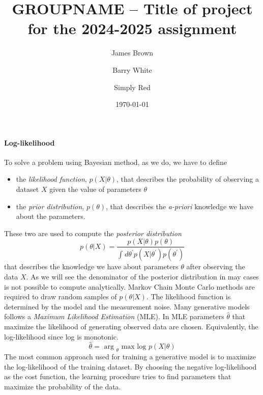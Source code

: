 \documentclass[prl,twocolumn]{revtex4-1}
\begin{document}
\title{GROUPNAME -- Title of project for the 2024-2025 assignment}





\author{James Brown}
\author{Barry White}
\author{Simply Red}

\date{\today}



\maketitle

\paragraph{\bf Log-likelihood} To solve a problem using Bayesian method, as we do, we have to define
\begin{itemize}
	\item the \emph{likelihood function}, $p\left( X|\theta   \right)$, that describes the probability of observing a dataset $X$ given the value of parameters $\theta $
	\item the \emph{prior distribution}, $p\left( \theta  \right)$, that describes the \emph{a-priori} knowledge we have about the parameters.
\end{itemize}
These two are used to compute the \emph{posterior distribution}
\begin{equation}
p\left( \theta |X  \right) = \frac{p\left( X|\theta  \right)p\left( \theta  \right)}{\int_{}^{}{d\theta^{\prime } p\left( X|\theta ^{\prime } \right)p\left( \theta ^{\prime } \right)}}
\end{equation}
that describes the knowledge we have  about parameters $\theta $ after observing the data $X$. As we will see the denominator of the posterior distribution in may cases is not possible to compute analytically. Markov Chain Monte Carlo methods are required to draw random samples of $p\left( \theta |X \right)$.
The likelihood function is determined by the model and the measurement noise. Many generative models follows a \emph{Maximum Likelihood Estimation} (MLE). In MLE parameters $\hat{\theta }$ that maximize the likelihood of generating observed data are chosen. Equivalently, the log-likelihood since log is monotonic.
\begin{equation}
\hat{\theta } = \text{ arg }_{\theta } \text{ max log }p\left( X|\theta  \right)
\end{equation}
The most common approach used for training a generative model is to maximize the log-likelihood of the training dataset. By choosing the negative log-likelihood as the cost function, the learning procedure tries to find parameters that maximize the probability of the data.
\end{document}
